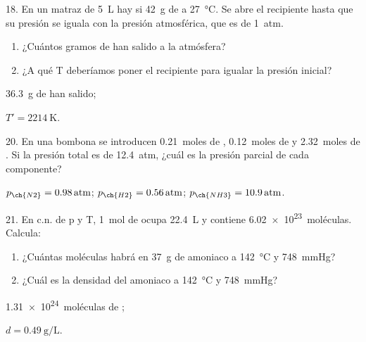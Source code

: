 \documentclass[10pt]{article}
\begin{document}
\begin{multicols}{2}
\begin{exercise}
  18. En un matraz de \SI{5}{\liter} hay si \SI{42}{\gram} de  a \SI{27}{\celsius}. Se abre el recipiente
  hasta que su presión se iguala con la presión atmosférica,
  que es de \SI{1}{atm}.
  \begin{enumerate}
    \item ¿Cuántos gramos de  han salido a la atmósfera?
    \item ¿A qué T deberíamos poner el recipiente para igualar la presión inicial?
  \end{enumerate}
\end{exercise}
\begin{solution}
  \begin{enumerate*}
    \item \SI{36.3}{\gram} de  han salido;
    \item $T' = \SI{2214}{\kelvin}$.
  \end{enumerate*}
\end{solution}

\begin{exercise}
  20. En una bombona se introducen \SI{0.21}{moles} de , \SI{0.12}{moles}
  de  y \SI{2.32}{moles} de . Si la presión total es de \SI{12.4}{atm}, ¿cuál es la presión parcial de cada componente?
\end{exercise}
\begin{solution}
  $p_{\ch{N2}} = \SI{0.98}{atm}$; $p_{\ch{H2}} = \SI{0.56}{atm}$; $p_{\ch{NH3}} = \SI{10.9}{atm}$.
\end{solution}

\begin{exercise}
  21. En c.n. de p y T, \SI{1}{mol} de  ocupa \SI{22.4}{\liter} y contiene \SI{6.02e23}{moléculas}. Calcula:
  \begin{enumerate}
    \item ¿Cuántas moléculas habrá en \SI{37}{\gram} de amoniaco a \SI{142}{\celsius} y \SI{748}{\mmHg}?
    \item ¿Cuál es la densidad del amoniaco a \SI{142}{\celsius} y \SI{748}{\mmHg}?
  \end{enumerate}
\end{exercise}
\begin{solution}
  \begin{enumerate*}
    \item \SI{1.31e24}{moléculas} de ; \item $d = \SI{0.49}{\gram\per\liter}$.
  \end{enumerate*}
\end{solution}


\end{multicols}
\end{document}
